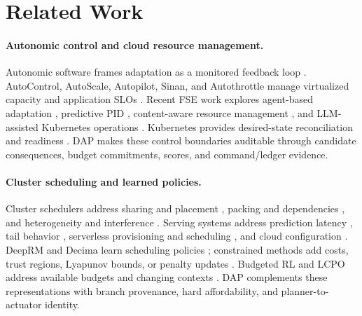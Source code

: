 \documentclass[acmsmall,screen,review,anonymous]{acmart}
\begin{document}
\section{Related Work}

\paragraph{Autonomic control and cloud resource management.}
Autonomic software frames adaptation as a monitored feedback loop
\cite{kephart2003autonomic}. AutoControl, AutoScale, Autopilot, Sinan, and
Autothrottle manage virtualized capacity and application SLOs
\cite{padala2009autocontrol,gandhi2012autoscale,rzadca2020autopilot,
zhang2021sinan,wang2024autothrottle}. Recent FSE work explores agent-based
adaptation \cite{sanwouo2025aware}, predictive PID \cite{xiao2025tepid},
content-aware resource management \cite{duan2026aims}, and LLM-assisted
Kubernetes operations \cite{vitui2026aiops}. Kubernetes provides desired-state
reconciliation and readiness \cite{burns2016kubernetes,kuberneteshpa,kubernetesprobes}.
DAP makes these control boundaries auditable through candidate consequences,
budget commitments, scores, and command/ledger evidence.

\paragraph{Cluster scheduling and learned policies.}
Cluster schedulers address sharing and placement
\cite{hindman2011mesos,schwarzkopf2013omega,vavilapalli2013yarn,verma2015borg,gog2016firmament},
packing and dependencies \cite{grandl2014tetris,grandl2016graphene}, and
heterogeneity and interference \cite{delimitrou2013paragon,delimitrou2014quasar}.
Serving systems address prediction latency \cite{crankshaw2017clipper,gujarati2020clockwork},
tail behavior \cite{dean2013tail}, serverless provisioning and scheduling
\cite{akkus2018sand,oakes2018sock,kaffes2019core,shahrad2020serverless}, and
cloud configuration \cite{alipourfard2017cherrypick}. DeepRM and Decima learn
scheduling policies \cite{mao2016deeprm,mao2019decima}; constrained methods add
costs, trust regions, Lyapunov bounds, or penalty updates
\cite{altman1999cmdp,achiam2017cpo,
tessler2019rcpo,stooke2020pid,chow2018lyapunov,zhang2022p3o}. Budgeted RL
and LCPO address available budgets and changing contexts
\cite{carrara2019budgeted,hamadanian2025lcpo}. DAP complements these representations
with branch provenance, hard affordability, and planner-to-actuator identity.
\end{document}
